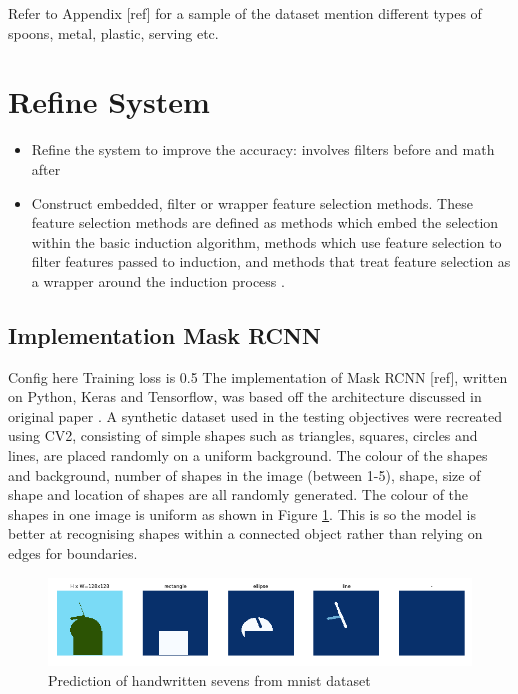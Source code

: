 Refer to Appendix [ref] for a sample of the dataset 
mention different types of spoons, metal, plastic, serving etc.


\section{Refine System}
\begin{itemize}
	\item Refine the system to improve the accuracy: involves filters before and math after
	\item Construct embedded, filter or wrapper feature selection methods. These feature selection methods are defined as methods which embed the selection within the basic induction algorithm, methods which use feature selection to filter features passed to induction, and methods that treat feature selection as a wrapper around the induction process \cite{blum1997selection}.
\end{itemize}
 

\subsection{Implementation Mask RCNN}
Config here 
Training loss is 0.5
The implementation of Mask RCNN [ref], written on Python, Keras and Tensorflow, was based off the architecture discussed in original paper \cite{he2017mask}. A synthetic dataset used in the testing objectives were recreated using CV2, consisting of simple shapes such as triangles, squares, circles and lines, are placed randomly on a uniform background. The colour of the shapes and background, number of shapes in the image (between 1-5), shape, size of shape and location of shapes are all randomly generated. The colour of the shapes in one image is uniform as shown in Figure \ref{fig:dataset_ex}. This is so the model is better at recognising shapes within a connected object rather than relying on edges for boundaries. 
\begin{figure}[H]
	\begin{center}
		\includegraphics[width=160mm, scale=1]{maskrcnn_train.png}
		\caption{Prediction of handwritten sevens from mnist dataset}
		\label{fig:dataset_ex}
	\end{center}
	
\end{figure}

